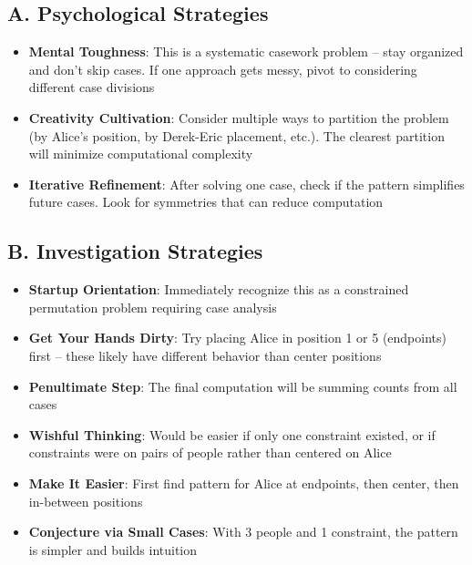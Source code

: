\documentclass[]{article}
\begin{document}
\begin{strategicbox}
\subsection*{A. Psychological Strategies}
\begin{itemize}[leftmargin=*]
    \item \textbf{Mental Toughness}: This is a systematic casework problem -- stay organized and don't skip cases. If one approach gets messy, pivot to considering different case divisions
    
    \item \textbf{Creativity Cultivation}: Consider multiple ways to partition the problem (by Alice's position, by Derek-Eric placement, etc.). The clearest partition will minimize computational complexity
    
    \item \textbf{Iterative Refinement}: After solving one case, check if the pattern simplifies future cases. Look for symmetries that can reduce computation
\end{itemize}

\subsection*{B. Investigation Strategies}
\begin{itemize}[leftmargin=*]
    \item \textbf{Startup Orientation}: Immediately recognize this as a constrained permutation problem requiring case analysis
    
    \item \textbf{Get Your Hands Dirty}: Try placing Alice in position 1 or 5 (endpoints) first -- these likely have different behavior than center positions
    
    \item \textbf{Penultimate Step}: The final computation will be summing counts from all cases
    
    \item \textbf{Wishful Thinking}: Would be easier if only one constraint existed, or if constraints were on pairs of people rather than centered on Alice
    
    \item \textbf{Make It Easier}: First find pattern for Alice at endpoints, then center, then in-between positions
    
    \item \textbf{Conjecture via Small Cases}: With 3 people and 1 constraint, the pattern is simpler and builds intuition
    

\end{itemize}
\end{strategicbox}
\end{document}
